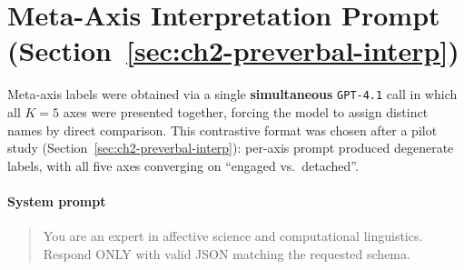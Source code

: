 \section{Meta-Axis Interpretation Prompt (Section~\ref{sec:ch2-preverbal-interp})}
\label{app:exp8_prompt}

Meta-axis labels were obtained via a single \textbf{simultaneous} \texttt{GPT-4.1} call in which
all $K=5$ axes were presented together, forcing the model to assign distinct names by direct comparison. This contrastive format was chosen after a pilot study (Section~\ref{sec:ch2-preverbal-interp}): per-axis prompt produced degenerate labels, with all five axes converging on ``engaged vs.\ detached''.

\paragraph{System prompt}
\begin{quote}
\small\ttfamily
You are an expert in affective science and computational linguistics.
Respond ONLY with valid JSON matching the requested schema.
\end{quote}

